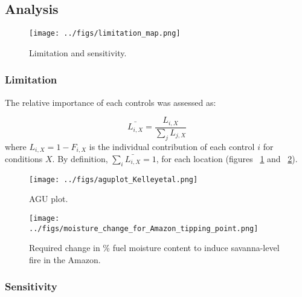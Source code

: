 \subsection{Analysis}

\begin{figure}[!ht]
\begin{shaded}
  \centering
    \texttt{[image: ../figs/limitation\_map.png]}

  \caption{Limitation and sensitivity.}
  \label{fig:lim_sen_maps}
\end{shaded}
\end{figure}

\subsubsection{Limitation}

The relative importance of each controls was assessed as:

\begin{equation}
    \bar{L_{i, X}} = \frac{L_{i, X}}{\sum_{j} L_{j, X}}
\end{equation}
where $L_{i, X} = 1 - F_{i,X}$ is the individual contribution of each control $i$ for conditions $X$. By definition, $\sum_{i} \bar{L_{i,X}} = 1$, for each location (figures ~\ref{fig:lim_sen_maps} and ~\ref{fig:agu_plot}).


\begin{figure}[!ht]
  \centering
    \texttt{[image: ../figs/aguplot\_Kelleyetal.png]}

  \caption{AGU plot.}
  \label{fig:agu_plot}
\end{figure}


\begin{figure}[!ht]
  \centering
    \texttt{[image: ../figs/moisture\_change\_for\_Amazon\_tipping\_point.png]}

  \caption{Required change in \% fuel moisture content to induce savanna-level fire in the Amazon.}
  \label{fig:amazon}
\end{figure}

\subsubsection{Sensitivity}


